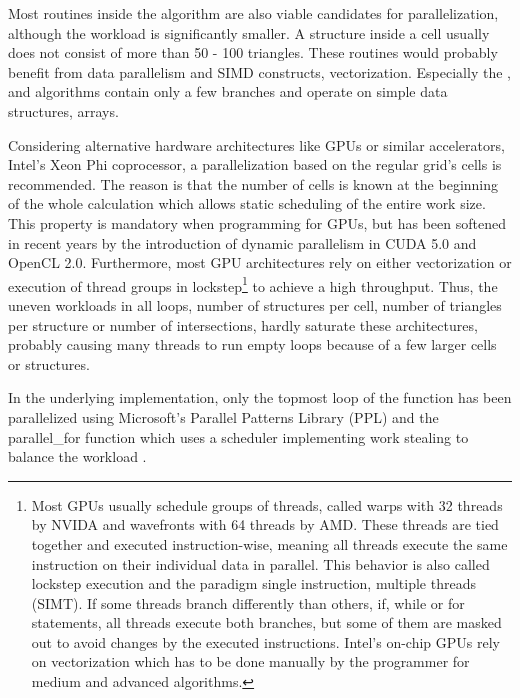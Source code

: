 Most routines inside the  algorithm are also viable candidates for parallelization, although the workload is significantly smaller.
A structure inside a cell usually does not consist of more than 50 - 100 triangles.
These routines would probably benefit from data parallelism and SIMD constructs, \ie vectorization.
Especially the ,  and  algorithms contain only a few branches and operate on simple data structures, \ie arrays.

Considering alternative hardware architectures like GPUs or similar accelerators, \eg Intel's Xeon Phi coprocessor, a parallelization based on the regular grid's cells is recommended.
The reason is that the number of cells is known at the beginning of the whole calculation which allows static scheduling of the entire work size.
This property is mandatory when programming for GPUs, but has been softened in recent years by the introduction of dynamic parallelism in CUDA 5.0 and OpenCL 2.0.
Furthermore, most GPU architectures rely on either vectorization or execution of thread groups in lockstep\footnote{
	Most GPUs usually schedule groups of threads, called warps with 32 threads by NVIDA and wavefronts with 64 threads by AMD.
	These threads are tied together and executed instruction-wise, meaning all threads execute the same instruction on their individual data in parallel.
	This behavior is also called lockstep execution and the paradigm single instruction, multiple threads (SIMT).
	If some threads branch differently than others, \eg if, while or for statements, all threads execute both branches, but some of them are masked out to avoid changes by the executed instructions.
	Intel's on-chip GPUs rely on vectorization which has to be done manually by the programmer for medium and advanced algorithms.} to achieve a high throughput.
Thus, the uneven workloads in all loops, \eg number of structures per cell, number of triangles per structure or number of intersections, hardly saturate these architectures, probably causing many threads to run empty loops because of a few larger cells or structures.

In the underlying implementation, only the topmost loop of the  function has been parallelized using Microsoft's Parallel Patterns Library (PPL) and the parallel\_for function which uses a scheduler implementing work stealing to balance the workload \cite{ppl_parallel_for}.
